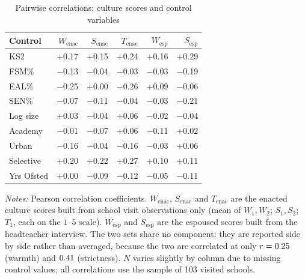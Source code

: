 \begin{table}[htbp]
  \centering
  \caption{Pairwise correlations: culture scores and control variables}
  \label{tab:score_controls_corr}
  \small
  \begin{tabular}{lrrrrr}
    \toprule
    Control & $W_{\text{enac}}$ & $S_{\text{enac}}$ & $T_{\text{enac}}$ & $W_{\text{esp}}$ & $S_{\text{esp}}$ \\
    \midrule
    KS2 & +0.17 & +0.15 & +0.24 & +0.16 & +0.29 \\
    FSM\% & $-$0.13 & $-$0.04 & $-$0.03 & $-$0.03 & $-$0.19 \\
    EAL\% & $-$0.25 & +0.00 & $-$0.26 & +0.09 & $-$0.06 \\
    SEN\% & $-$0.07 & $-$0.11 & $-$0.04 & $-$0.03 & $-$0.21 \\
    Log size & +0.03 & $-$0.04 & +0.06 & $-$0.02 & $-$0.04 \\
    Academy & $-$0.01 & $-$0.07 & +0.06 & $-$0.11 & +0.02 \\
    Urban & $-$0.16 & $-$0.04 & $-$0.16 & $-$0.03 & +0.06 \\
    Selective & +0.20 & +0.22 & +0.27 & +0.10 & +0.11 \\
    Yrs Ofsted & +0.00 & $-$0.09 & $-$0.12 & $-$0.05 & $-$0.11 \\
    \bottomrule
  \end{tabular}
  \begin{minipage}{\linewidth}
    \vspace{2pt}
    \footnotesize
    \textit{Notes:} Pearson correlation coefficients. $W_{\text{enac}}$,
    $S_{\text{enac}}$ and $T_{\text{enac}}$ are the enacted culture scores
    built from school visit observations only (mean of $W_1, W_2$; $S_1, S_2$;
    $T_1$, each on the $1$--$5$ scale). $W_{\text{esp}}$ and $S_{\text{esp}}$ are the
    espoused scores built from the headteacher interview. The two sets share no
    component; they are reported side by side rather than averaged, because
    the two are correlated at only $r = 0.25$ (warmth) and
    $0.41$ (strictness).
    $N$ varies slightly by column due to missing
    control values; all correlations use the sample of 103 visited schools.
  \end{minipage}
\end{table}
